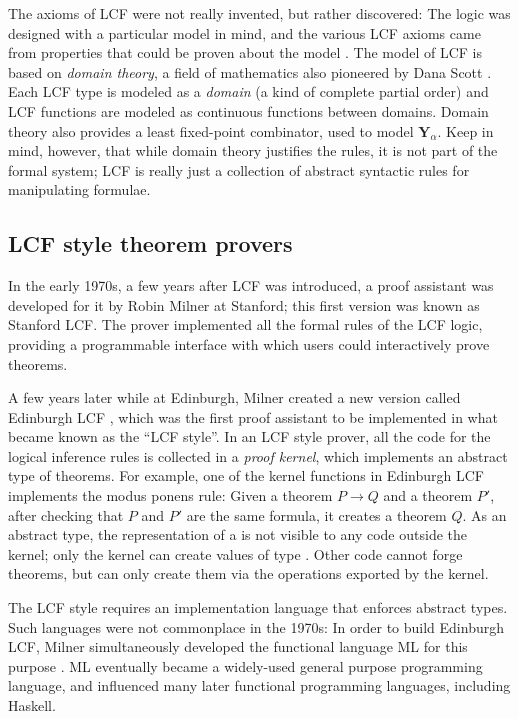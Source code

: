 The axioms of LCF were not really invented, but rather discovered: The logic was designed with a particular model in mind, and the various LCF axioms came from properties that could be proven about the model \cite{Scott1993lcf}. The model of LCF is based on \emph{domain theory}, a field of mathematics also pioneered by Dana Scott \cite{gunter90semantic}. Each LCF type is modeled as a \emph{domain} (a kind of complete partial order) and LCF functions are modeled as continuous functions between domains. Domain theory also provides a least fixed-point combinator, used to model $\mathbf{Y}_\alpha$. Keep in mind, however, that while domain theory justifies the rules, it is not part of the formal system; LCF is really just a collection of abstract syntactic rules for manipulating formulae.

\subsection{LCF style theorem provers}

In the early 1970s, a few years after LCF was introduced, a proof assistant was developed for it by Robin Milner at Stanford; this first version was known as Stanford LCF. The prover implemented all the formal rules of the LCF logic, providing a programmable interface with which users could interactively prove theorems.

A few years later while at Edinburgh, Milner created a new version called Edinburgh LCF \cite{GMW79}, which was the first proof assistant to be implemented in what became known as the ``LCF style''. In an LCF style prover, all the code for the logical inference rules is collected in a \emph{proof kernel}, which implements an abstract type  of theorems. For example, one of the kernel functions in Edinburgh LCF implements the modus ponens rule: Given a theorem $P \longrightarrow Q$ and a theorem $P'$, after checking that $P$ and $P'$ are the same formula, it creates a theorem $Q$. As an abstract type, the representation of a  is not visible to any code outside the kernel; only the kernel can create values of type . Other code cannot forge theorems, but can only create them via the operations exported by the kernel.

The LCF style requires an implementation language that enforces abstract types. Such languages were not commonplace in the 1970s: In order to build Edinburgh LCF, Milner simultaneously developed the functional language ML for this purpose \cite{GMW79}. ML eventually became a widely-used general purpose programming language, and influenced many later functional programming languages, including Haskell.

